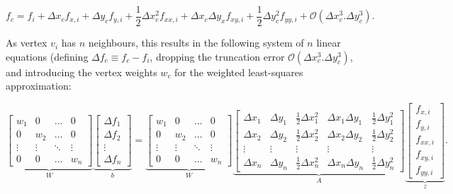 \documentclass{article}
\begin{document}
\begin{equation} \label{eq:disc_taylor}
f_c = f_i + \Delta x_c f_{x,i} + \Delta y_c f_{y,i} + \frac{1}{2} \Delta x_c^2 f_{xx,i} + \Delta x_c \Delta y_x f_{xy,i} + \frac{1}{2} \Delta y_c^2 f_{yy,i} 
+ \mathcal{O} \left( \Delta x_c^3. \Delta y_c^3 \right).
\end{equation}

As vertex $v_i$ has $n$ neighbours, this results in the following system of $n$ linear equations (defining $\Delta f_c \equiv f_c - f_i$, dropping the truncation error $\mathcal{O} \left( \Delta x_c^3. \Delta y_c^3 \right)$, and introducing the vertex weights $w_c$ for the weighted least-squares approximation:

\begin{equation} \label{eq:disc_LSmatrix}
\underbrace{\begin{bmatrix}
w_1 & 0 & \ldots & 0 \\ 0 & w_2 & \ldots & 0 \\ \vdots & \vdots & \ddots & \vdots \\ 0 & 0 & \ldots & w_n
 \end{bmatrix}}_W
\underbrace{\begin{bmatrix}
\Delta f_1 \\ \Delta f_2 \\ \vdots \\ \Delta f_n
 \end{bmatrix}}_b
 =
\underbrace{\begin{bmatrix}
w_1 & 0 & \ldots & 0 \\ 0 & w_2 & \ldots & 0 \\ \vdots & \vdots & \ddots & \vdots \\ 0 & 0 & \ldots & w_n
 \end{bmatrix}}_W
\underbrace{\begin{bmatrix}
\Delta x_1 & \Delta y_1 & \frac{1}{2} \Delta x_1^2 & \Delta x_1 \Delta y_1 & \frac{1}{2} \Delta y_1^2 \\
\Delta x_2 & \Delta y_2 & \frac{1}{2} \Delta x_2^2 & \Delta x_2 \Delta y_2 & \frac{1}{2} \Delta y_2^2 \\
\vdots & \vdots & \vdots & \vdots & \vdots \\
\Delta x_n & \Delta y_n & \frac{1}{2} \Delta x_n^2 & \Delta x_n \Delta y_n & \frac{1}{2} \Delta y_n^2
 \end{bmatrix}}_A
\underbrace{\begin{bmatrix}
f_{x,i} \\ f_{y,i} \\ f_{xx,i} \\ f_{xy,i} \\ f_{yy,i} 
 \end{bmatrix}}_z.
\end{equation}
\end{document}
